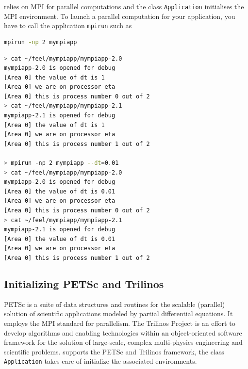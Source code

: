 \feel relies on MPI for parallel computations and the class
\lstinline!Application!  initialises the MPI environment. To launch a parallel computation for your application, you have to call the application \verb|mpirun| such as
\begin{lstlisting}[language=sh]
mpirun -np 2 mympiapp
\end{lstlisting}

\begin{lstlisting}[language=sh]
> cat ~/feel/mympiapp/mympiapp-2.0
mympiapp-2.0 is opened for debug
[Area 0] the value of dt is 1
[Area 0] we are on processor eta
[Area 0] this is process number 0 out of 2
> cat ~/feel/mympiapp/mympiapp-2.1
mympiapp-2.1 is opened for debug
[Area 0] the value of dt is 1
[Area 0] we are on processor eta
[Area 0] this is process number 1 out of 2

> mpirun -np 2 mympiapp --dt=0.01
> cat ~/feel/mympiapp/mympiapp-2.0
mympiapp-2.0 is opened for debug
[Area 0] the value of dt is 0.01
[Area 0] we are on processor eta
[Area 0] this is process number 0 out of 2
> cat ~/feel/mympiapp/mympiapp-2.1
mympiapp-2.1 is opened for debug
[Area 0] the value of dt is 0.01
[Area 0] we are on processor eta
[Area 0] this is process number 1 out of 2
\end{lstlisting}


\subsection{Initializing PETSc and Trilinos}


PETSc is a suite of data structures and routines for the scalable (parallel) solution of scientific applications modeled by partial differential equations. It employs the MPI standard for parallelism.  \newline \newline The Trilinos Project is an effort to develop algorithms and enabling technologies within an object-oriented software framework for the solution of large-scale, complex multi-physics engineering and scientific problems. \newline \newline
\feel supports the PETSc and Trilinos framework, the class \lstinline!Application! takes care of initialize the associated environments. \newline


